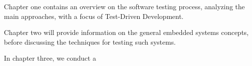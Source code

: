 Chapter one contains an overview on the software testing process, analyzing the main approaches, with a focus of Test-Driven Development.

Chapter two will provide information on the general embedded systems concepts, before discussing the techniques for testing such systems.

In chapter three, we conduct a 
